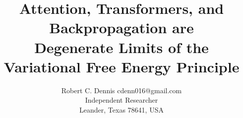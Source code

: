 \documentclass[twoside,11pt]{article}
\begin{document}

\title{Attention, Transformers, and Backpropagation are\\
Degenerate Limits of the Variational Free Energy Principle}

\author{\name Robert C. Dennis \email cdenn016@gmail.com \\
       \addr Independent Researcher\\
       \addr Leander, Texas 78641, USA}


\maketitle

\end{document}
